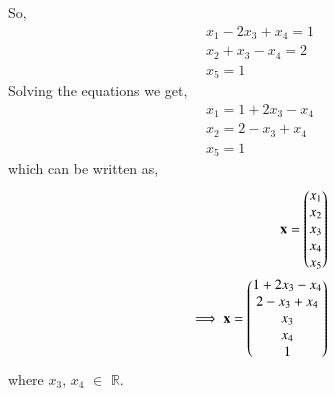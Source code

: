 \documentclass[journal,12pt,twocolumn]{IEEEtran}
\begin{document}
So,
\begin{align}
x_1-2x_3+x_4=1\\
x_2+x_3-x_4=2\\
x_5=1
\end{align}
Solving the equations we get,
\begin{align}
x_1=1+2x_3-x_4\\
x_2=2-x_3+x_4\\
x_5=1
\end{align}
which can be written as,
   \begin{align}
   \mathbf{x} = \begin{pmatrix}x_1\\x_2\\x_3 \\ x_4 \\ x_5\end{pmatrix} \\
   \implies \mathbf{x}=\begin{pmatrix}1+2x_3-x_4\\2-x_3+x_4\\x_3\\x_4\\1\end{pmatrix}
\end{align}
where $x_3$, $x_4$ $\in$ $\mathbb{R}$.
\end{document}
